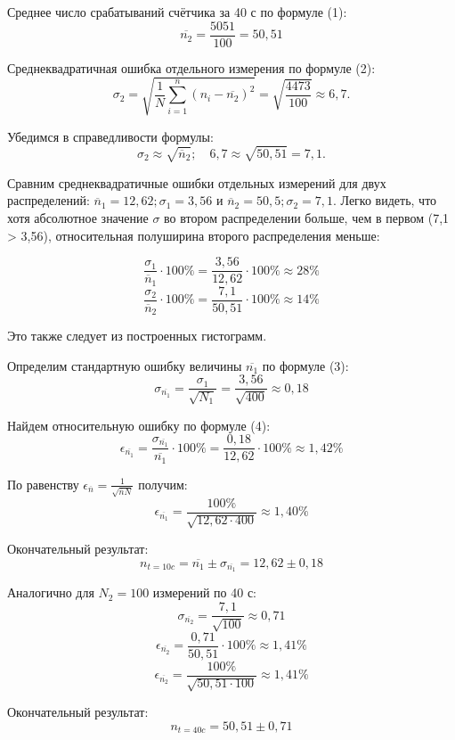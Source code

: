 Среднее число срабатываний счётчика за 40 с по формуле (1):
\[\overline{n_2} = \frac{5051}{100} = 50,51\]

Среднеквадратичная ошибка отдельного измерения по формуле (2):
\[\sigma_2 = \sqrt{\frac{1}{N}\sum\limits_{i=1}^n (n_i-\overline{n_2})^2} = \sqrt{\frac{4473}{100}} \approx 6,7.\]

Убедимся в справедливости формулы:
\[\sigma_2 \approx \sqrt{\overline{n}_2};\quad 6,7 \approx \sqrt{50,51} = 7,1.\]

Сравним среднеквадратичные ошибки отдельных измерений для двух распределений:
$\overline{n}_1 = 12,62; \sigma_1 = 3,56$ и $\overline{n}_2 = 50,5; \sigma_2 = 7,1$.
Легко видеть, что хотя абсолютное значение $\sigma$ во втором распределении больше,
чем в первом (7,1 > 3,56), относительная полуширина второго распределения меньше:

\[\frac{\sigma_1}{\overline{n}_1}\cdot100\% = \frac{3,56}{12,62}\cdot100\% \approx 28\% \]
\[\frac{\sigma_2}{\overline{n}_2}\cdot100\% = \frac{7,1}{50,51}\cdot100\% \approx 14\% \]

Это также следует из построенных гистограмм.



Определим стандартную ошибку величины $\overline{n_1}$ по формуле (3):
\[\sigma_{\overline{n_1}} = \frac{\sigma_1}{\sqrt{N_1}} = \frac{3,56}{\sqrt{400}} \approx 0,18\]


Найдем относительную ошибку по формуле (4):
\[\epsilon_{\overline{n_1}} = \frac{\sigma_{\overline{n_1}}}{\overline{n_1}}\cdot100\% = \frac{0,18}{12,62}\cdot100\% \approx 1,42\%\]

По равенству $\epsilon_{\overline{n}} = \frac{1}{\sqrt{\overline{n}N}}$ получим:
\[\epsilon_{\overline{n_1}} = \frac{100\%}{\sqrt{12,62\cdot400}} \approx 1,40\%\]

Окончательный результат:
\[n_{t=10c} = \overline{n_1} \pm \sigma_{\overline{n_1}} = 12,62 \pm 0,18\]

Аналогично для $N_2 = 100$ измерений по 40 с:
\[\sigma_{\overline{n_2}} = \frac{7,1}{\sqrt{100}} \approx 0,71\]
\[\epsilon_{\overline{n_2}} = \frac{0,71}{50,51}\cdot100\% \approx 1,41\%\]
\[\epsilon_{\overline{n_2}} = \frac{100\%}{\sqrt{50,51\cdot100}} \approx 1,41\%\]

Окончательный результат:
\[n_{t=40c} = 50,51 \pm 0,71\]



